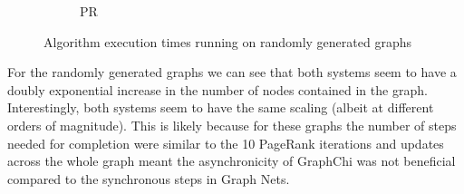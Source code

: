 \documentclass[sigconf,nonacm]{acmart}
\begin{document}
\begin{figure}
\begin{subfigure}{.3\textwidth}
  \centering
  \caption{PR}
\end{subfigure}
\caption{Algorithm execution times running on randomly generated graphs}
\label{fig:random}
\end{figure}

For the randomly generated graphs we can see that both systems seem to have a doubly exponential increase in the number of nodes contained in the graph. Interestingly, both systems seem to have the same scaling (albeit at different orders of magnitude). This is likely because for these graphs the number of steps needed for completion were similar to the 10 PageRank iterations and updates across the whole graph meant the asynchronicity of GraphChi was not beneficial compared to the synchronous steps in Graph Nets.
\end{document}
